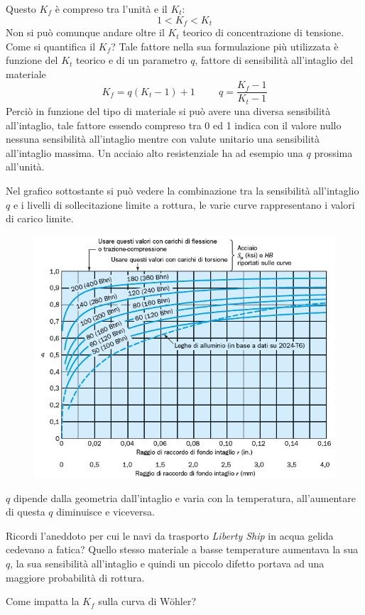 			 Questo $K_f$ è compreso tra l'unità e il $K_t$:
			 \[1<K_f<K_t\]
			 Non si può comunque andare oltre il  $K_t$ teorico di concentrazione di tensione.
			 Come si quantifica il  $K_f$? Tale fattore nella sua formulazione più utilizzata è funzione del  $K_t$ teorico e di un parametro $ q $, fattore di sensibilità all'intaglio del materiale
			 \[K_f = q(K_t-1) + 1 \hspace{1cm} q = \dfrac{K_f-1}{K_t-1}\] 
			 Perciò in funzione del tipo di materiale si può avere una diversa sensibilità all'intaglio, tale fattore essendo compreso tra 0 ed 1 indica con il valore nullo nessuna sensibilità all'intaglio mentre con valute unitario una sensibilità all'intaglio massima. Un acciaio alto resistenziale ha ad esempio una $ q $ prossima all'unità. \newline
			 
			 Nel grafico sottostante si può vedere la combinazione tra la sensibilità all'intaglio $ q $ e i livelli di sollecitazione limite a rottura, le varie curve rappresentano i valori di carico limite.
			 
			 \begin{figure}[H]
			 	\centering
			 	\includegraphics[width=0.5\linewidth]{immagini_10/screenshot026}
			 	\label{fig:screenshot026}
			 \end{figure}			 
			 
			   $ q $ dipende dalla geometria dall'intaglio e varia con la temperatura, all'aumentare di questa $ q $ diminuisce  e viceversa.
			   
			   Ricordi l'aneddoto per cui le navi da trasporto \textit{Liberty Ship} in acqua gelida cedevano a fatica? Quello stesso materiale a basse temperature aumentava la sua $ q $, la sua sensibilità all'intaglio e quindi un piccolo difetto portava ad una maggiore probabilità di rottura. \newline
			   
			 Come impatta la $K_f$ sulla curva di Wöhler?
			 
